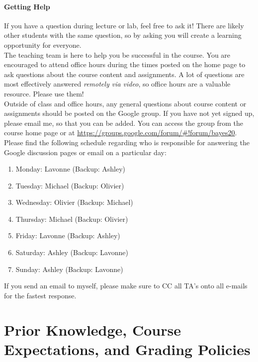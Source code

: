 \documentclass[11pt]{article}
\begin{document}
\paragraph{Getting Help}

If you have a question during lecture or lab, feel free to ask it! There are likely other students with the same question, so by asking you will create a learning opportunity for everyone. \\ 

The teaching team is here to help you be successful in the course. You are encouraged to attend office hours during the times posted on the home page to ask questions about the course content and assignments. A lot of questions are most effectively answered \emph{remotely via video}, so office hours are a valuable resource. Please use them! \\ 

Outside of class and office hours, any general questions about course content or assignments should be posted on the Google group. If you have not yet signed up, please email me, so that you can be added. You can access the group from the course home page or at \url{https://groups.google.com/forum/#!forum/bayes20}. \\

Please find the following schedule regarding who is responsible for answering the Google discussion pages or email on a particular day:

\begin{enumerate}
\item Monday: Lavonne (Backup: Ashley)
\item Tuesday: Michael (Backup: Olivier)
\item Wednesday: Olivier (Backup: Michael)
\item Thursday: Michael (Backup: Olivier)
\item Friday: Lavonne (Backup: Ashley)
\item Saturday: Ashley (Backup: Lavonne)
\item Sunday: Ashley (Backup: Lavonne)
\end{enumerate}

If you send an email to myself, please make sure to CC all TA's onto all e-mails for the fastest response.\\


\section{Prior Knowledge, Course Expectations, and Grading Policies}
\end{document}
